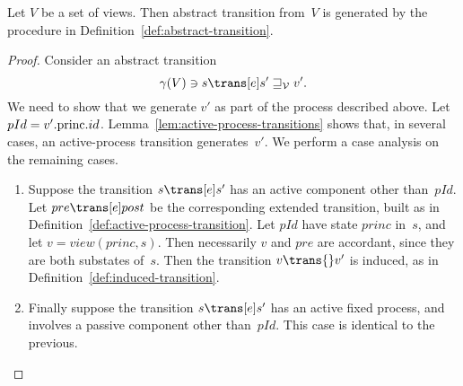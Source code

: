 
\begin{prop}
\label{lem:abstract-transitions-sound}
Let $V$ be a set of views.  Then abstract transition from~$V$ is generated by
the procedure in Definition~\ref{def:abstract-transition}.
\end{prop}

\begin{proof} 
Consider an abstract transition
\[
\gamma(V) \ni s \trans[e] s' \sqge_{\V} v'.
\]
We need to show that we generate $v'$ as part of the process described above.
%
Let $pId = v'.\mathrm{princ}.id$.
%
Lemma~\ref{lem:active-process-transitions} shows that, in several cases, an
active-process transition generates~$v'$. 
%
We perform a case analysis on the remaining cases.
%
\begin{enumerate}

\item
Suppose the transition $s \trans[e] s'$ has an active component other
than~$pId$.  Let $pre \trans[e] post$ be the corresponding extended
transition, built as in Definition~\ref{def:active-process-transition}.  Let
$pId$ have state $princ$ in~$s$, and let
$v = view(princ, s)$.  Then necessarily $v$ and $pre$ are accordant, since
they are both substates of~$s$.  Then the transition $v \trans{} v'$ is
induced, as in Definition~\ref{def:induced-transition}.

\item\label{step:abs-trans-correct-3}
Finally suppose the transition $s \trans[e] s'$ has an active fixed process,
and involves a passive component other than~$pId$.  This case is identical to
the previous.
\end{enumerate}
\end{proof}

